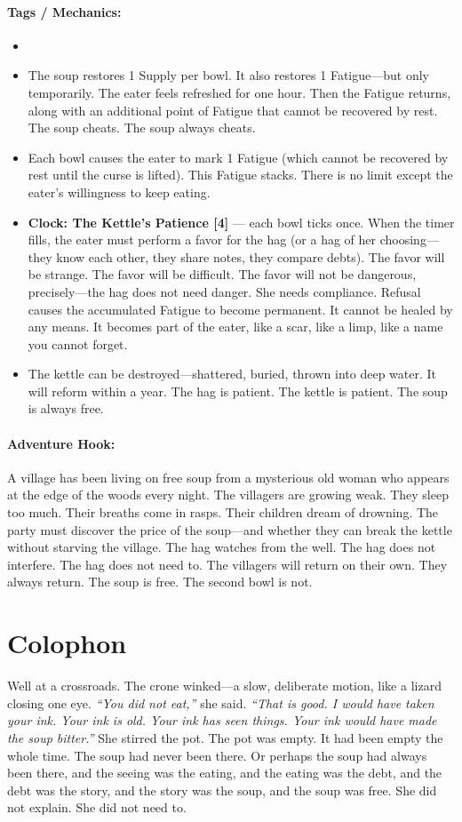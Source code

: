 \paragraph{Tags / Mechanics:}
\begin{itemize}
\item [HEAL] [CURSE] [SACRIFICE] [PRESSURE]
\item The soup restores 1 Supply per bowl. It also restores 1 Fatigue---but only temporarily. The eater feels refreshed for one hour. Then the Fatigue returns, along with an additional point of Fatigue that cannot be recovered by rest. The soup cheats. The soup always cheats.
\item Each bowl causes the eater to mark 1 Fatigue (which cannot be recovered by rest until the curse is lifted). This Fatigue stacks. There is no limit except the eater's willingness to keep eating.
\item \textbf{Clock: The Kettle's Patience [4]} --- each bowl ticks once. When the timer fills, the eater must perform a favor for the hag (or a hag of her choosing---they know each other, they share notes, they compare debts). The favor will be strange. The favor will be difficult. The favor will not be dangerous, precisely---the hag does not need danger. She needs compliance. Refusal causes the accumulated Fatigue to become permanent. It cannot be healed by any means. It becomes part of the eater, like a scar, like a limp, like a name you cannot forget.
\item The kettle can be destroyed---shattered, buried, thrown into deep water. It will reform within a year. The hag is patient. The kettle is patient. The soup is always free.
\end{itemize}

\paragraph{Adventure Hook:}
A village has been living on free soup from a mysterious old woman who appears at the edge of the woods every night. The villagers are growing weak. They sleep too much. Their breaths come in rasps. Their children dream of drowning. The party must discover the price of the soup---and whether they can break the kettle without starving the village. The hag watches from the well. The hag does not interfere. The hag does not need to. The villagers will return on their own. They always return. The soup is free. The second bowl is not.

\section*{Colophon}
Well at a crossroads. The crone winked---a slow, deliberate motion, like a lizard closing one eye. \textit{``You did not eat,''} she said. \textit{``That is good. I would have taken your ink. Your ink is old. Your ink has seen things. Your ink would have made the soup bitter.''} She stirred the pot. The pot was empty. It had been empty the whole time. The soup had never been there. Or perhaps the soup had always been there, and the seeing was the eating, and the eating was the debt, and the debt was the story, and the story was the soup, and the soup was free. She did not explain. She did not need to.